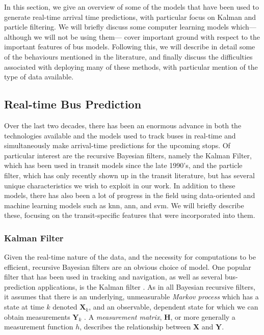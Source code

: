 \documentclass[12pt,a4paper]{article}
\newcommand{\bY}{\mathbf{Y}}
\newcommand{\bX}{\mathbf{X}}
\newcommand{\mat}[1]{\mathbf{#1}}
\newcommand{\kf}{Kalman filter}
\begin{document}
In this section, we give an overview of some of the models that have been used
to generate real-time arrival time predictions,
with particular focus on Kalman and particle filtering.
We will briefly discuss some computer learning models which---%
although we will not be using them---%
cover important ground with respect to the important features of bus models.
Following this, we will describe in detail some of the
behaviours mentioned in the literature,
and finally discuss the difficulties associated with deploying many of these methods,
with particular mention of the type of data available.


\subsection{Real-time Bus Prediction}
\label{sec:history}

Over the last two decades,
there has been an enormous advance in both the technologies available and the models used
to track buses in real-time and simultaneously make arrival-time predictions for the upcoming stops.
Of particular interest are the recursive Bayesian filters,
namely the Kalman Filter, which has been used in transit models since the late 1990's,
and the particle filter, which has only recently shown up in the transit literature,
but has several unique characteristics we wish to exploit in our work.
In addition to these models,
there has also been a lot of progress in the field using data-oriented and machine learning models
such as \gls{knn}, \gls{ann}, and \gls{svm}.
We will briefly describe these,
focusing on the transit-specific features that were incorporated into them.



\subsubsection{Kalman Filter}
\label{sec:kalman-filter}

Given the real-time nature of the data, and the necessity for computations to be efficient,
recursive Bayesian filters are an obvious choice of model.
One popular filter that has been used in tracking and navigation,
as well as several bus-prediction applications,
is the \kf{} \citep{wall-dailey:1999,dailey:2001,shalaby-farhan:2004}.
As in all Bayesian recursive filters,
it assumes that there is an underlying, unmeasurable \emph{Markov process}
which has a state at time $k$ denoted $\bX_k$,
and an observable, dependent state for which we can obtain measurements $\bY_k$
\citep{jazwinski:1970}.
A \emph{measurement matrix}, $\mat{H}$,
or more generally a measurement function $h$,
describes the relationship between $\bX$ and $\bY$.
\end{document}
